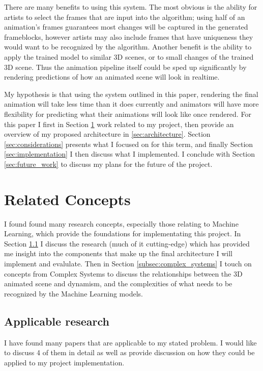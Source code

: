 \documentclass[conference]{IEEEtran}
\begin{document}
There are many benefits to using this system. The most obvious is the ability
for artists to select the frames that are input into the algorithm; using half
of an animation's frames guarantees most changes will be captured in the
generated frameblocks, however artists may also include frames that have
uniqueness they would want to be recognized by the algorithm. Another benefit is
the ability to apply the trained model to similar 3D scenes, or to small changes
of the trained 3D scene. Thus the animation pipeline itself could be sped up
significantly by rendering predictions of how an animated scene will look in
realtime.

My hypothesis is that using the system outlined in this paper, rendering the
final animation will take less time than it does currently and animators will
have more flexibility for predicting what their animations will look like once
rendered. For this paper I first in Section \ref{sec:related_concepts} work
related to my project, then provide an overview
of my proposed architecture in \ref{sec:architecture}. Section
\ref{sec:considerations} presents what I focused on for this term, and finally
Section \ref{sec:implementation} I then discuss what I implemented.
I conclude with Section \ref{sec:future_work} to discuss my plans for the future of
the project.

\section{Related Concepts}
\label{sec:related_concepts}
I found found many research concepts, especially those relating to Machine Learning,
which provide the foundations for implementating this project.
In Section \ref{subsec:applicable} I discuss the
research (much of it cutting-edge) which has provided me insight into the
components that make up the final architecture I will implement and evalulate.
Then in Section \ref{subsec:complex_systems} I
touch on concepts from Complex Systems to discuss the relationships between
the 3D animated scene and dynamism, and the complexities of what needs to be
recognized by the Machine Learning models.

\subsection{Applicable research}
\label{subsec:applicable}
I have found many papers that are applicable to my stated problem. I would like
to discuss 4 of them in detail as well as provide
discussion on how they could be applied to my project implementation.
\end{document}
